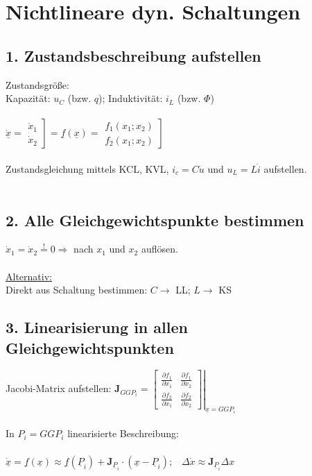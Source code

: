 \documentclass[a4paper,twocolumn,10pt]{article}
\newcommand{\sollsein}{\stackrel{!}{=}}
\begin{document}
\section*{Nichtlineare dyn. Schaltungen}
\subsection*{1. Zustandsbeschreibung aufstellen}
Zustandsgröße:\\
Kapazität: $u_C$ (bzw. $q$); Induktivität: $i_L$ (bzw. $\Phi$)\\\\
$\dot{\underline{x}}=\left.\begin{matrix}\dot x_1 \\ \dot x_2\end{matrix}\right] =\underline{f}(\underline{x})=\left.\begin{matrix}f_1(x_1;x_2) \\ f_2(x_1;x_2)\end{matrix}\right]$\\\\
Zustandsgleichung mittels KCL, KVL, $i_c=C\dot u$ und $u_L=L\dot i$ aufstellen.\\\\
\subsection*{2. Alle Gleichgewichtspunkte bestimmen}
$\dot x_1 =\dot x_2\sollsein 0\Rightarrow$ nach $x_1$ und $x_2$ auflösen.\\\\
\underline{Alternativ:}\\
Direkt aus Schaltung bestimmen: $C\rightarrow$ LL; $L\rightarrow$ KS
\subsection*{3. Linearisierung in allen Gleichgewichtspunkten}
Jacobi-Matrix aufstellen: $\textbf{J}_{GGP_i}=\left.\begin{bmatrix}\frac{\partial f_1}{\partial x_1} & \frac{\partial f_1}{\partial x_2}\\ \frac{\partial f_2}{\partial x_1} & \frac{\partial f_2}{\partial x_2}\end{bmatrix}\right|_{\underline{x}=GGP_i}$\\\\
In $P_i=GGP_i$ linearisierte Beschreibung:\\\\
$\dot{\underline{x}}=\underline{f}(\underline{x})\approx \underline{f}(\underline{P}_i)+\textbf{J}_{\underline{P}_i}\cdot (\underline{x}-\underline{P}_i);\;\;\;\Delta \dot x\approx \textbf{J}_{\underline{P}_i}\Delta x$
\end{document}
